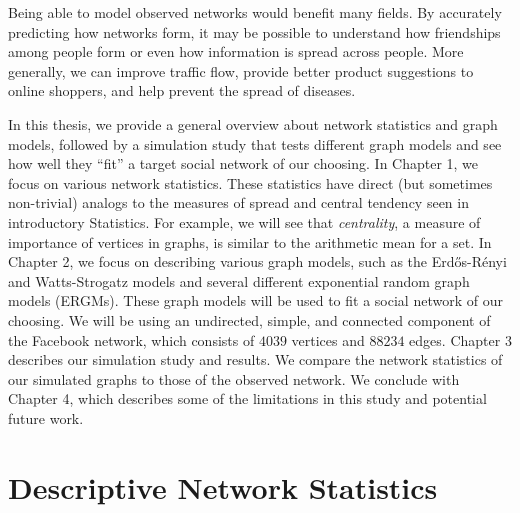 \documentclass[12pt,twoside]{amherstthesis}
\begin{document}
  Being able to model observed networks would benefit many fields. By
  accurately predicting how networks form, it may be possible to
  understand how friendships among people form or even how information is
  spread across people. More generally, we can improve traffic flow,
  provide better product suggestions to online shoppers, and help prevent
  the spread of diseases.
  
  In this thesis, we provide a general overview about network statistics
  and graph models, followed by a simulation study that tests different
  graph models and see how well they ``fit'' a target social network of
  our choosing. In Chapter 1, we focus on various network statistics.
  These statistics have direct (but sometimes non-trivial) analogs to the
  measures of spread and central tendency seen in introductory Statistics.
  For example, we will see that \emph{centrality}, a measure of importance
  of vertices in graphs, is similar to the arithmetic mean for a set. In
  Chapter 2, we focus on describing various graph models, such as the
  Erdős-Rényi and Watts-Strogatz models and several different exponential
  random graph models (ERGMs). These graph models will be used to fit a
  social network of our choosing. We will be using an undirected, simple,
  and connected component of the Facebook network, which consists of
  \(4039\) vertices and \(88234\) edges. Chapter 3 describes our
  simulation study and results. We compare the network statistics of our
  simulated graphs to those of the observed network. We conclude with
  Chapter 4, which describes some of the limitations in this study and
  potential future work.
  
  \chapter{Descriptive Network
  Statistics}\label{descriptive-network-statistics}
  
\end{document}
